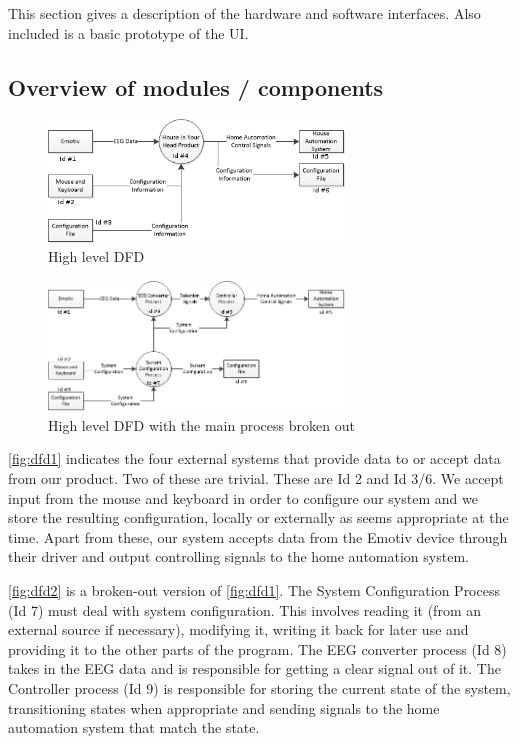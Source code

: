 \documentclass{article}
\begin{document}
This section gives a description of the hardware and software interfaces. Also included is a basic prototype of the UI.

\subsection{Overview of modules / components}

\begin{figure}[h!]
	
  \centering
    \includegraphics[width=0.7\textwidth]{DFD1}
   \caption{High level DFD}
   \label{fig:dfd1}
\end{figure}

\begin{figure}[h!]
	
  \centering
    \includegraphics[width=0.7\textwidth]{DFD2}
   \caption{High level DFD with the main process broken out}
   \label{fig:dfd2}
\end{figure}

\autoref{fig:dfd1} indicates the four external systems that
provide data to or accept data from our product. Two of these are trivial.
These are Id 2 and Id 3/6. We accept input from the mouse and keyboard in
order to configure our system and we store the resulting configuration,
locally or externally as seems appropriate at the time. Apart from these, our
system accepts data from the Emotiv device through their driver and output
controlling signals to the home automation system.

\autoref{fig:dfd2} is a broken-out version of \autoref{fig:dfd1}. The System
Configuration Process (Id 7) must deal with system configuration. This
involves reading it (from an external source if necessary), modifying it,
writing it back for later use and providing it to the other parts of the
program. The EEG converter process (Id 8) takes in the EEG data and is
responsible for getting a clear signal out of it. The Controller process (Id
9) is responsible for storing the current state of the system, transitioning
states when appropriate and sending signals to the home automation system that
match the state.
\end{document}
